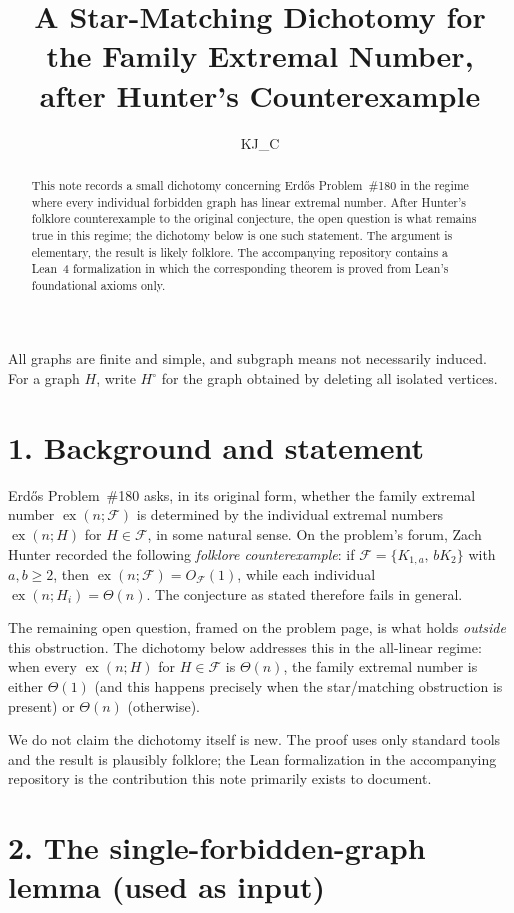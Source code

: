 \documentclass[11pt]{article}
\title{A Star-Matching Dichotomy for the Family Extremal Number,\\
       after Hunter's Counterexample}
\author{KJ\_C}
\date{}
\newcommand{\ex}{\operatorname{ex}}
\begin{document}
\maketitle

\begin{abstract}
This note records a small dichotomy concerning Erd\H{o}s Problem~\#180 in
the regime where every individual forbidden graph has linear extremal
number. After Hunter's folklore counterexample to the original conjecture,
the open question is what remains true in this regime; the dichotomy
below is one such statement. The argument is elementary, the result is
likely folklore. The accompanying repository contains a Lean~4
formalization in which the corresponding theorem is proved from Lean's
foundational axioms only.
\end{abstract}

All graphs are finite and simple, and subgraph means not necessarily induced.
For a graph \(H\), write \(H^\circ\) for the graph obtained by deleting all
isolated vertices.

\section*{1. Background and statement}

Erd\H{o}s Problem~\#180 asks, in its original form, whether the family
extremal number \(\ex(n;\mathcal F)\) is determined by the individual
extremal numbers \(\ex(n;H)\) for \(H\in\mathcal F\), in some natural sense.
On the problem's forum, Zach Hunter recorded the following \emph{folklore
counterexample}: if \(\mathcal F=\{K_{1,a},\,bK_2\}\) with \(a,b\ge 2\),
then \(\ex(n;\mathcal F)=O_{\mathcal F}(1)\), while each individual
\(\ex(n;H_i)=\Theta(n)\). The conjecture as stated therefore fails in
general.

The remaining open question, framed on the problem page, is what holds
\emph{outside} this obstruction. The dichotomy below addresses this in the
all-linear regime: when every \(\ex(n;H)\) for \(H\in\mathcal F\) is
\(\Theta(n)\), the family extremal number is either \(\Theta(1)\) (and
this happens precisely when the star/matching obstruction is present) or
\(\Theta(n)\) (otherwise).

We do not claim the dichotomy itself is new. The proof uses only standard
tools and the result is plausibly folklore; the Lean formalization in the
accompanying repository is the contribution this note primarily exists to
document.

\section*{2. The single-forbidden-graph lemma (used as input)}
\end{document}
